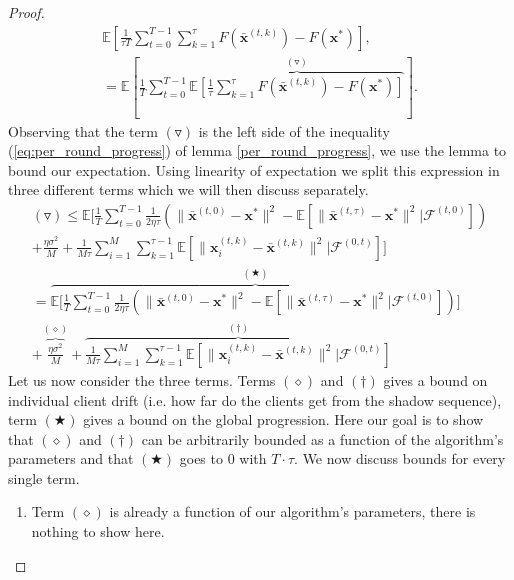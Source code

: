 \begin{proof}
    \begin{align*}
        \mathbb{E} \left[ \frac{1}{\tau T} \sum_{t=0}^{T-1}\sum_{k=1}^{\tau} F(\bar{\bm{x}}^{(t,k)}) - F(\bm{x}^*)\right], \\
        = \mathbb{E} \left[\frac{1}{T} \sum^{T-1}_{t=0} \overbrace{\mathbb{E} \left[ \frac{1}{\tau} \sum_{k=1}^{\tau} F(\bar{\bm{x}}^{(t,k)}) - F(\bm{x}^*)\right] }^{(\triangledown)}\right].
    \end{align*}
    Observing that the term $(\triangledown)$ is the left side of the inequality (\ref{eq:per_round_progress}) of lemma \ref{per_round_progress}, we use the lemma to bound our expectation. Using linearity of expectation we split this expression in three different terms which we will then discuss separately.
    \begin{align*}
        (\triangledown) \leq \mathbb{E}
        \Bigg[ \frac{1}{T} \sum_{t=0}^{T-1} \frac{1}{2 \eta \tau} \left( \| \bar{\bm{x}}^{(t,0)} -\bm{x}^{*} \|^2 - \mathbb{E}\left[  \| \bar{\bm{x}}^{(t,\tau)} -\bm{x}^{*} \|^2  | \mathcal{F}^{(t,0)}\right]  \right) \\
        + \frac{\eta \sigma^2}{M} + \frac{1}{M \tau} \sum^M_{i=1} \sum^{\tau-1}_{k=1} \mathbb{E} \left[ \| \bm{x}_i^{(t,k)} -\bar{\bm{x}}^{(t,k)} \|^2 | \mathcal{F}^{(0,t)}\right] \Bigg] \\
        = \overbrace{\mathbb{E}\Bigg[ \frac{1}{T} \sum_{t=0}^{T-1} \frac{1}{2 \eta \tau} \left( \| \bar{\bm{x}}^{(t,0)} -\bm{x}^{*} \|^2 - \mathbb{E}\left[  \| \bar{\bm{x}}^{(t,\tau)} -\bm{x}^{*} \|^2  | \mathcal{F}^{(t,0)}\right] \right) \Bigg]}^{(\bigstar)} \\
        + \overbrace{\frac{\eta \sigma^2}{M}}^{(\diamond)} +  \overbrace{\frac{1}{M \tau}\sum^M_{i=1} \sum^{\tau-1}_{k=1} \mathbb{E} \left[ \| \bm{x}_i^{(t,k)} -\bar{\bm{x}}^{(t,k)} \|^2 | \mathcal{F}^{(0,t)}\right] }^{(\dagger)}
    \end{align*}
    Let us now consider the three terms. Terms $(\diamond)$ and $(\dagger)$ gives a bound on individual client drift (i.e. how far do the clients get from the shadow sequence), term $(\bigstar)$ gives a bound on the global progression. Here our goal is to show that $(\diamond)$ and $(\dagger)$ can be arbitrarily bounded as a function of the algorithm's parameters and that $(\bigstar)$ goes to $0$ with $T\cdot \tau$. We now discuss bounds for every single term.
    \begin{enumerate}
        \item Term $(\diamond)$ is already a function of our algorithm's parameters, there is nothing to show here.

\end{enumerate}
\end{proof}
